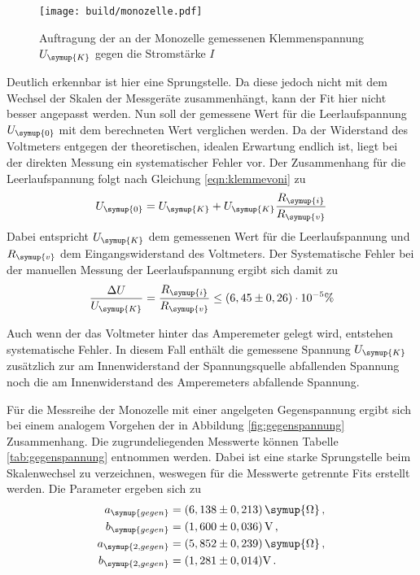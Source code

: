 \begin{figure}
  \centering
  \texttt{[image: build/monozelle.pdf]}
  \caption{Auftragung der an der Monozelle gemessenen Klemmenspannung $U_{\symup{K}}$
  gegen die Stromstärke $I$}
  \label{fig:monozelle}
\end{figure}

Deutlich erkennbar ist hier eine Sprungstelle. Da diese jedoch nicht mit dem Wechsel
der Skalen der Messgeräte zusammenhängt, kann der Fit hier nicht besser angepasst
werden.
Nun soll der gemessene Wert für die Leerlaufspannung $U_{\symup{0}}$ mit dem
berechneten Wert verglichen werden. Da der Widerstand des Voltmeters entgegen
der theoretischen, idealen Erwartung endlich ist, liegt bei der direkten Messung
ein systematischer Fehler vor. Der Zusammenhang für die Leerlaufspannung folgt
nach Gleichung \eqref{eqn:klemmevoni} zu
\begin{equation}
  U_{\symup{0}}=U_{\symup{K}}+U_{\symup{K}}\frac{R_{\symup{i}}}{R_{\symup{v}}}
\end{equation}
Dabei entspricht $U_{\symup{K}}$ dem gemessenen Wert für die Leerlaufspannung
und $R_{\symup{v}}$ dem Eingangswiderstand des Voltmeters.
Der Systematische Fehler bei der manuellen Messung der Leerlaufspannung ergibt
sich damit zu
\begin{equation}
  \frac{\Delta U}{U_{\symup{K}}}=\frac{R_{\symup{i}}}{R_{\symup{v}}} \leq (6,45\pm0,26)\cdot10^{-5}\%
\end{equation}

Auch wenn der das Voltmeter hinter das Amperemeter gelegt wird, entstehen systematische
Fehler. In diesem Fall enthält die gemessene Spannung $U_{\symup{K}}$ zusätzlich
zur am Innenwiderstand der Spannungsquelle abfallenden Spannung noch die am Innenwiderstand
des Amperemeters abfallende Spannung.

Für die Messreihe der Monozelle mit einer angelgeten Gegenspannung ergibt sich
bei einem analogem Vorgehen der in Abbildung \ref{fig:gegenspannung} Zusammenhang.
Die zugrundeliegenden Messwerte können Tabelle \ref{tab:gegenspannung} entnommen werden.
Dabei ist eine starke Sprungstelle beim Skalenwechsel zu verzeichnen, weswegen für
die Messwerte getrennte Fits erstellt werden. Die Parameter ergeben sich zu
\begin{align}
  a_{\symup{gegen}}&=(6,138\pm0,213)\,\symup{\Omega}\,,\\
  b_{\symup{gegen}}&=(1,600\pm0,036)\,\text{V}\,,\\
  a_{\symup{2,gegen}}&=(5,852\pm0,239)\,\symup{\Omega}\,,\\
  b_{\symup{2,gegen}}&=(1,281\pm0,014)\text{V}\,.
\end{align}

